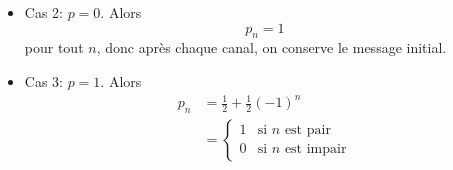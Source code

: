 {\begin{td-sol}[]
\begin{enumerate}
\begin{itemize}[label=\ptr{}]
                \item Cas 2: \(p=0\). Alors
                \begin{equation*}
                    p_n = 1
                \end{equation*}
                pour tout \(n\), donc après chaque canal, on
                conserve le message initial.

                \item Cas 3: \(p=1\). Alors
                \begin{equation*}
                    \begin{aligned}
                        p_n &= \frac12 + \frac12{(-1)}^n\\
                        &=\begin{cases}
                            1 & \text{si } n \text{ est pair}\\
                            0 & \text{si } n \text{ est impair}
                        \end{cases}
                    \end{aligned}
                \end{equation*}
            \end{itemize}
        \end{enumerate}
    \end{td-sol}
}{}

